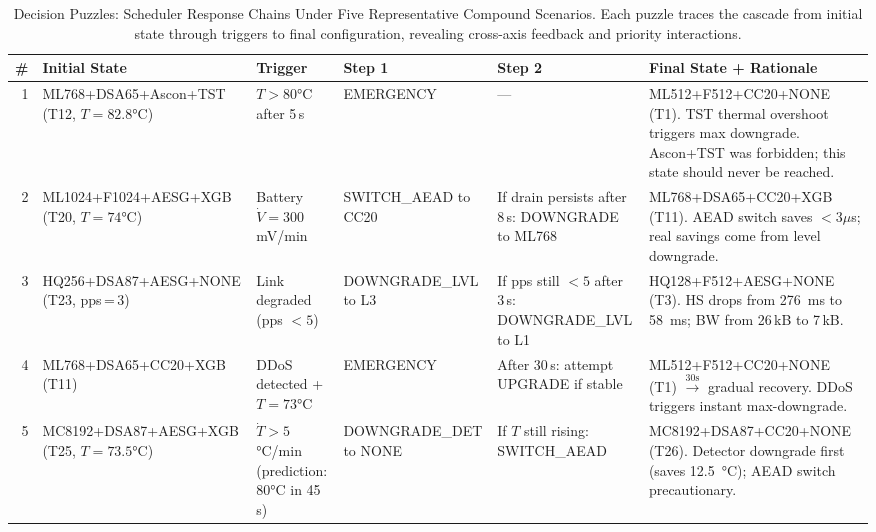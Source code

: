 \begin{table}[!t]
\centering
\caption{Decision Puzzles: Scheduler Response Chains Under Five
Representative Compound Scenarios.  Each puzzle traces the cascade
from initial state through triggers to final configuration, revealing
cross-axis feedback and priority interactions.}
\label{tab:sched_puzzles}
\footnotesize
\setlength{\tabcolsep}{2.5pt}
\begin{tabular}{@{}r p{3.3cm} p{2.3cm} p{1.8cm} p{1.8cm}
  p{4.5cm}@{}}
\toprule
\textbf{\#} & \textbf{Initial State}
& \textbf{Trigger} & \textbf{Step 1} & \textbf{Step 2}
& \textbf{Final State + Rationale} \\
\midrule
1 & ML768+DSA65+Ascon+TST (T12, $T{=}82.8$°C)
  & $T>80$°C after 5\,s
  & EMERGENCY
  & ---
  & ML512+F512+CC20+NONE (T1). TST thermal overshoot triggers
    max downgrade. Ascon+TST was forbidden; this state should
    never be reached. \\
\midrule
2 & ML1024+F1024+AESG+XGB (T20, $T{=}74$°C)
  & Battery $\dot{V}{=}300$\,mV/min
  & SWITCH\_AEAD to CC20
  & If drain persists after 8\,s: DOWNGRADE to ML768
  & ML768+DSA65+CC20+XGB (T11). AEAD switch saves $<3\mu$s;
    real savings come from level downgrade. \\
\midrule
3 & HQ256+DSA87+AESG+NONE (T23, pps\,=\,3)
  & Link degraded (pps $<5$)
  & DOWNGRADE\_LVL to L3
  & If pps still $<5$ after 3\,s: DOWNGRADE\_LVL to L1
  & HQ128+F512+AESG+NONE (T3). HS drops from
    \SI{276}{\ms} to \SI{58}{\ms}; BW from 26\,kB to 7\,kB. \\
\midrule
4 & ML768+DSA65+CC20+XGB (T11)
  & DDoS detected + $T{=}73$°C
  & EMERGENCY
  & After 30\,s: attempt UPGRADE if stable
  & ML512+F512+CC20+NONE (T1) $\xrightarrow{30\text{s}}$
    gradual recovery.  DDoS triggers instant max-downgrade. \\
\midrule
5 & MC8192+DSA87+AESG+XGB (T25, $T{=}73.5$°C)
  & $\dot{T}>5$°C/min (prediction: 80°C in 45\,s)
  & DOWNGRADE\_DET to NONE
  & If $T$ still rising: SWITCH\_AEAD
  & MC8192+DSA87+CC20+NONE (T26). Detector downgrade first
    (saves \SI{12.5}{\degreeCelsius}); AEAD switch precautionary. \\
\bottomrule
\end{tabular}
\end{table}

